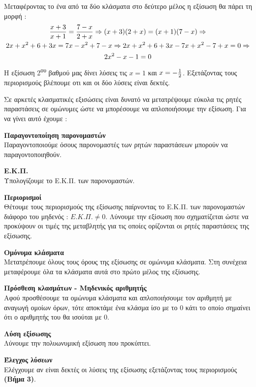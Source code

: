 \documentclass[twoside,nofonts,internet,methodoi]{thewria}
\DeclareRobustCommand{\frac}[3][0pt]{%
{\begingroup\hspace{#1}#2\hspace{#1}\endgroup\over\hspace{#1}#3\hspace{#1}}}
\newcommand{\tss}[1]{\textsuperscript{#1}}
\begin{document}
Μεταφέροντας το ένα από τα δύο κλάσματα στο δεύτερο μέλος η εξίσωση θα πάρει τη μορφή :
\begin{gather*}
\frac{x+3}{x+1}=\frac{7-x}{2+x}\Rightarrow (x+3)(2+x)=(x+1)(7-x)\Rightarrow \\2x+x^2+6+3x=7x-x^2+7-x\Rightarrow
2x+x^2+6+3x-7x+x^2-7+x=0\Rightarrow\\
2x^2-x-1=0
\end{gather*}
Η εξίσωση 2\tss{ου} βαθμού μας δίνει λύσεις τις $ x=1 $ και $ x=-\frac{1}{2} $. Εξετάζοντας τους περιορισμούς βλέπουμε οτι και οι δύο λύσεις είναι δεκτές.
\begin{Methodos}
Σε αρκετές κλασματικές εξισώσεις είναι δυνατό να μετατρέψουμε εύκολα τις ρητές παραστάσεις σε ομώνυμες ώστε να μπορέσουμε να απλοποιήσουμε την εξίσωση. Για να γίνει αυτό έχουμε :
\begin{bhma}
\item \textbf{Παραγοντοποίηση παρονομαστών}\\
Παραγοντοποιούμε όσους παρονομαστές των ρητών παραστάσεων μπορούν να παραγοντοποιηθούν.
\item \textbf{Ε.Κ.Π.}\\
Υπολογίζουμε το Ε.Κ.Π. των παρονομαστών.
\item \textbf{Περιορισμοί}\\
Θέτουμε τους περιορισμούς της εξίσωσης παίρνοντας το Ε.Κ.Π. των παρονομαστών διάφορο του μηδενός : $ E.K.\varPi.\neq0 $. Λύνουμε την εξίσωση που σχηματίζεται ώστε να προκύψουν οι τιμές της μεταβλητής για τις οποίες ορίζονται οι ρητές παραστάσεις της εξίσωσης.
\item \textbf{Ομόνυμα κλάσματα}\\
Μετατρέπουμε όλους τους όρους της εξίσωσης σε ομώνυμα κλάσματα. Στη συνέχεια μεταφέρουμε όλα τα κλάσματα αυτά στο πρώτο μέλος της εξίσωσης.
\item \textbf{Πρόσθεση κλασμάτων - Μηδενικός αριθμητής}\\
Αφού προσθέσουμε τα ομώνυμα κλάσματα και απλοποιήσουμε τον αριθμητή με αναγωγή ομοίων όρων, τότε αποκτάμε ένα κλάσμα ίσο με το $ 0 $ κάτι το οποίο σημαίνει ότι ο αριθμητής του θα ισούται με $ 0 $.
\item \textbf{Λύση εξίσωσης}\\
Λύνουμε την πολυωνυμική εξίσωση που προκύπτει.
\item \textbf{Έλεγχος λύσεων}\\
Ελέγχουμε αν είναι δεκτές οι λύσεις της εξίσωσης εξετάζοντας τους περιορισμούς \textbf{(Βήμα 3)}.
\end{bhma}
\end{Methodos}
\end{document}
